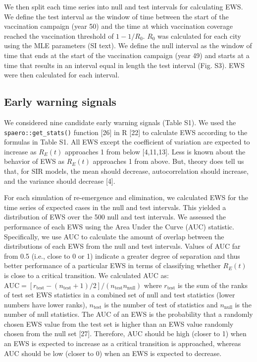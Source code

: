 \documentclass[3p]{elsarticle} %
\begin{document}
We then split each time series into null and test intervals for
calculating EWS. We define the test interval as the window of time
between the start of the vaccination campaign (year 50) and the time at
which vaccination coverage reached the vaccination threshold of
\(1 - 1/R_0\). \(R_0\) was calculated for each city using the MLE
parameters (SI text). We define the null interval as the window of time
that ends at the start of the vaccination campaign (year 49) and starts
at a time that results in an interval equal in length the test interval
(Fig. S3). EWS were then calculated for each interval.

\hypertarget{early-warning-signals}{%
\subsection{Early warning signals}\label{early-warning-signals}}

We considered nine candidate early warning signals (Table S1). We used
the \texttt{spaero::get\_stats()} function {[}26{]} in R {[}22{]} to
calculate EWS according to the formulas in Table S1. All EWS except the
coefficient of variation are expected to increase as \(R_E(t)\)
approaches 1 from below {[}4,11,13{]}. Less is known about the behavior
of EWS as \(R_E(t)\) approaches 1 from above. But, theory does tell us
that, for SIR models, the mean should decrease, autocorrelation should
increase, and the variance should decrease {[}4{]}.

For each simulation of re-emergence and elimination, we calculated EWS
for the time series of expected cases in the null and test intervals.
This yielded a distribution of EWS over the 500 null and test intervals.
We assessed the performance of each EWS using the Area Under the Curve
(AUC) statistic. Specifically, we use AUC to calculate the amount of
overlap between the distributions of each EWS from the null and test
intervals. Values of AUC far from 0.5 (i.e., close to 0 or 1) indicate a
greater degree of separation and thus better performance of a particular
EWS in terms of classifying whether \(R_E(t)\) is close to a critical
transition. We calculated AUC as:
\(\text{AUC} = \left[r_{\text{test}} - \left(n_{\text{test}}+1\right)/2\right] / \left(n_{\text{test}}n_{\text{null}}\right)\)
where \(r_{\text{test}}\) is the sum of the ranks of test set EWS
statistics in a combined set of null and test statistics (lower numbers
have lower ranks), \(n_{\text{test}}\) is the number of test of
statistics and \(n_{\text{null}}\) is the number of null statistics. The
AUC of an EWS is the probability that a randomly chosen EWS value from
the test set is higher than an EWS value randomly chosen from the null
set {[}27{]}. Therefore, AUC should be high (closer to 1) when an EWS is
expected to increase as a critical transition is approached, whereas AUC
should be low (closer to 0) when an EWS is expected to decrease.
\end{document}
